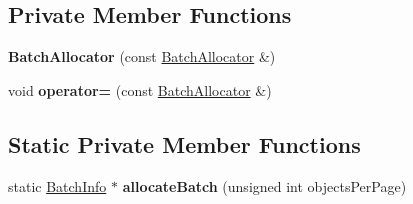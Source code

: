 \subsection*{Private Member Functions}
\begin{DoxyCompactItemize}
\item 
\hypertarget{class_json_1_1_batch_allocator_af240399628f3cf1099ede92ef1ec4274}{{\bfseries Batch\-Allocator} (const \hyperlink{class_json_1_1_batch_allocator}{Batch\-Allocator} \&)}\label{class_json_1_1_batch_allocator_af240399628f3cf1099ede92ef1ec4274}

\item 
\hypertarget{class_json_1_1_batch_allocator_ad2ab8896da0685b6c7eb5f7bfd5304d3}{void {\bfseries operator=} (const \hyperlink{class_json_1_1_batch_allocator}{Batch\-Allocator} \&)}\label{class_json_1_1_batch_allocator_ad2ab8896da0685b6c7eb5f7bfd5304d3}

\end{DoxyCompactItemize}
\subsection*{Static Private Member Functions}
\begin{DoxyCompactItemize}
\item 
\hypertarget{class_json_1_1_batch_allocator_a41f6367bbed5bdf39d2c8dc8f6bbf29d}{static \hyperlink{struct_json_1_1_batch_allocator_1_1_batch_info}{Batch\-Info} $\ast$ {\bfseries allocate\-Batch} (unsigned int objects\-Per\-Page)}\label{class_json_1_1_batch_allocator_a41f6367bbed5bdf39d2c8dc8f6bbf29d}

\end{DoxyCompactItemize}
